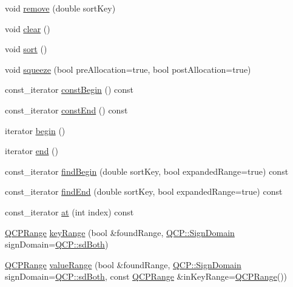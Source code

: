 \begin{DoxyCompactItemize}
\item 
void \mbox{\hyperlink{class_q_c_p_data_container_a2dbded7f0732bacf9db48fdfbbb620bc}{remove}} (double sort\+Key)
\item 
void \mbox{\hyperlink{class_q_c_p_data_container_a7e2b29736c6fd761649bda1a54ba967f}{clear}} ()
\item 
void \mbox{\hyperlink{class_q_c_p_data_container_a75da92e33063b63d6da5014683591d45}{sort}} ()
\item 
void \mbox{\hyperlink{class_q_c_p_data_container_a82fcc511def22287fc62579d0706387c}{squeeze}} (bool pre\+Allocation=true, bool post\+Allocation=true)
\item 
const\+\_\+iterator \mbox{\hyperlink{class_q_c_p_data_container_a49d7622999e2de67fa2331626a3159aa}{const\+Begin}} () const
\item 
const\+\_\+iterator \mbox{\hyperlink{class_q_c_p_data_container_aa7f7cf239b85b1a28de3d675cc5b3da1}{const\+End}} () const
\item 
iterator \mbox{\hyperlink{class_q_c_p_data_container_a80032518413ab8f418f7c81182fd06cb}{begin}} ()
\item 
iterator \mbox{\hyperlink{class_q_c_p_data_container_acf66dfad83fe041380f5e0491e7676f2}{end}} ()
\item 
const\+\_\+iterator \mbox{\hyperlink{class_q_c_p_data_container_a2ad8a5399072d99a242d3a6d2d7e278a}{find\+Begin}} (double sort\+Key, bool expanded\+Range=true) const
\item 
const\+\_\+iterator \mbox{\hyperlink{class_q_c_p_data_container_afb8b8f23cc2b7234a793a25ce79fe48f}{find\+End}} (double sort\+Key, bool expanded\+Range=true) const
\item 
const\+\_\+iterator \mbox{\hyperlink{class_q_c_p_data_container_ae90c7457a052b223539906e6bddc0a92}{at}} (int index) const
\item 
\mbox{\hyperlink{class_q_c_p_range}{Q\+C\+P\+Range}} \mbox{\hyperlink{class_q_c_p_data_container_aba6e1a93c21ccc56a432b4a02c9d0ed2}{key\+Range}} (bool \&found\+Range, \mbox{\hyperlink{namespace_q_c_p_afd50e7cf431af385614987d8553ff8a9}{Q\+C\+P\+::\+Sign\+Domain}} sign\+Domain=\mbox{\hyperlink{namespace_q_c_p_afd50e7cf431af385614987d8553ff8a9aa38352ef02d51ddfa4399d9551566e24}{Q\+C\+P\+::sd\+Both}})
\item 
\mbox{\hyperlink{class_q_c_p_range}{Q\+C\+P\+Range}} \mbox{\hyperlink{class_q_c_p_data_container_a35a102dc2424d1228fc374d9313efbe9}{value\+Range}} (bool \&found\+Range, \mbox{\hyperlink{namespace_q_c_p_afd50e7cf431af385614987d8553ff8a9}{Q\+C\+P\+::\+Sign\+Domain}} sign\+Domain=\mbox{\hyperlink{namespace_q_c_p_afd50e7cf431af385614987d8553ff8a9aa38352ef02d51ddfa4399d9551566e24}{Q\+C\+P\+::sd\+Both}}, const \mbox{\hyperlink{class_q_c_p_range}{Q\+C\+P\+Range}} \&in\+Key\+Range=\mbox{\hyperlink{class_q_c_p_range}{Q\+C\+P\+Range}}())

\end{DoxyCompactItemize}
